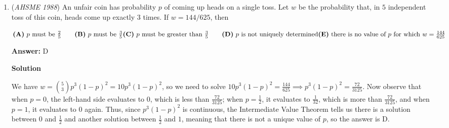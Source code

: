 \begin{enumerate}
$\textbf{(A)}\ AB=3, CD=1\qquad \textbf{(B)}\ AB=5, CD=2\qquad \textbf{(C)}\ AB=7, CD=3\qquad\\ \textbf{(D)}\ AB=9, CD=4\qquad \textbf{(E)}\ AB=11, CD=5$

 \textbf{Answer: }D



\textbf{Solution}

Let $E$ and $F$ be the intersections of lines $AB$ and $BC$ with the circle. One can prove that $BCDE$ is a rectangle, so $BE=CD$.

 In order for the area of trapezoid $ABCD$ to be an integer, the expression $\frac{(AB+CD)BC}2=(AB+CD)BF$ must be an integer, so $BF$ must be rational.

 By Power of a Point, $AB\cdot BE=BF^2\implies AB\cdot CD=BF^2$, so $AB\cdot CD$ must be a perfect square. Among the choices, the only one where $AB\cdot CD$ is a perfect square is $\textbf{(D)}\ AB=9, CD=4$



	\item (\textit{AHSME 1988}) An unfair coin has probability $p$ of coming up heads on a single toss. 
Let $w$ be the probability that, in $5$ independent toss of this coin, 
heads come up exactly $3$ times. If $w = 144 / 625$, then 


 $\textbf{(A)}\ p\text{ must be }\frac{2}{5}\qquad \textbf{(B)}\ p\text{ must be }\frac{3}{5}\qquad\\ \textbf{(C)}\ p\text{ must be greater than }\frac{3}{5}\qquad \textbf{(D)}\ p\text{ is not uniquely determined}\qquad\\ \textbf{(E)}\ \text{there is no value of } p \text{ for which }w =\frac{144}{625}$

 \textbf{Answer: }D



\textbf{Solution}

We have $w = {5\choose3}p^{3}(1-p)^{2} = 10p^{3}(1-p)^{2}$, so we need to solve $10p^{3}(1-p)^{2} = \frac{144}{625} \implies p^{3}(1-p)^{2} = \frac{72}{3125}$. Now observe that when $p=0$, the left-hand side evaluates to $0$, which is less than $\frac{72}{3125}$; when $p=\frac{1}{2}$, it evaluates to $\frac{1}{32}$, which is more than $\frac{72}{3125}$, and when $p=1$, it evaluates to $0$ again. Thus, since $p^{3}(1-p)^{2}$ is continuous, the Intermediate Value Theorem tells us there is a solution between $0$ and $\frac{1}{2}$ and another solution between $\frac{1}{2}$ and $1$, meaning that there is not a unique value of $p$, so the answer is $\boxed{\text{D}}$.


\end{enumerate}
